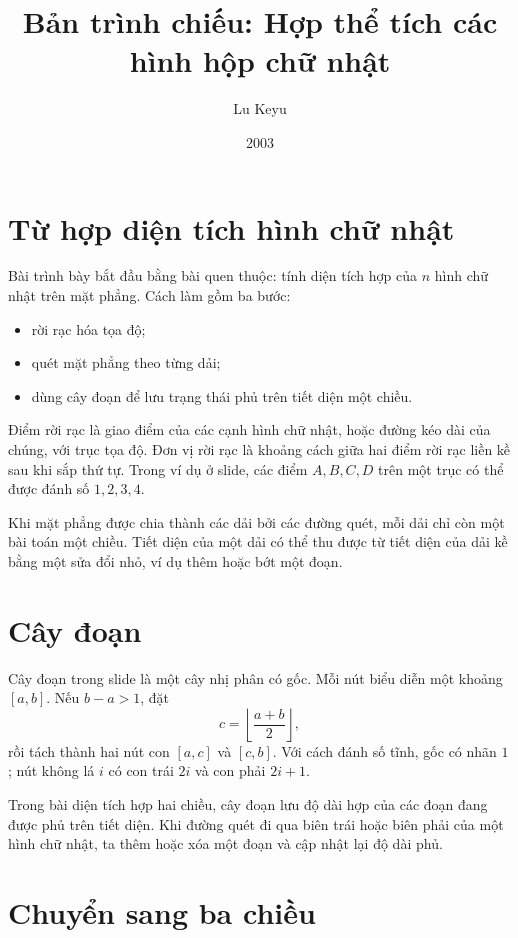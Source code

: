 \documentclass[11pt]{article}
\title{Bản trình chiếu: Hợp thể tích các hình hộp chữ nhật}
\author{Lu Keyu}
\date{2003}
\begin{document}
\maketitle


\section{Từ hợp diện tích hình chữ nhật}

Bài trình bày bắt đầu bằng bài quen thuộc: tính diện tích hợp của \(n\) hình
chữ nhật trên mặt phẳng. Cách làm gồm ba bước:
\begin{itemize}
  \item rời rạc hóa tọa độ;
  \item quét mặt phẳng theo từng dải;
  \item dùng cây đoạn để lưu trạng thái phủ trên tiết diện một chiều.
\end{itemize}

Điểm rời rạc là giao điểm của các cạnh hình chữ nhật, hoặc đường kéo dài của
chúng, với trục tọa độ. Đơn vị rời rạc là khoảng cách giữa hai điểm rời rạc
liền kề sau khi sắp thứ tự. Trong ví dụ ở slide, các điểm \(A,B,C,D\) trên
một trục có thể được đánh số \(1,2,3,4\).

Khi mặt phẳng được chia thành các dải bởi các đường quét, mỗi dải chỉ còn
một bài toán một chiều. Tiết diện của một dải có thể thu được từ tiết diện
của dải kề bằng một sửa đổi nhỏ, ví dụ thêm hoặc bớt một đoạn.

\section{Cây đoạn}

Cây đoạn trong slide là một cây nhị phân có gốc. Mỗi nút biểu diễn một
khoảng \([a,b]\). Nếu \(b-a>1\), đặt
\[
  c=\left\lfloor\frac{a+b}{2}\right\rfloor,
\]
rồi tách thành hai nút con \([a,c]\) và \([c,b]\). Với cách đánh số tĩnh,
gốc có nhãn \(1\); nút không lá \(i\) có con trái \(2i\) và con phải
\(2i+1\).

Trong bài diện tích hợp hai chiều, cây đoạn lưu độ dài hợp của các đoạn đang
được phủ trên tiết diện. Khi đường quét đi qua biên trái hoặc biên phải của
một hình chữ nhật, ta thêm hoặc xóa một đoạn và cập nhật lại độ dài phủ.

\section{Chuyển sang ba chiều}
\end{document}
